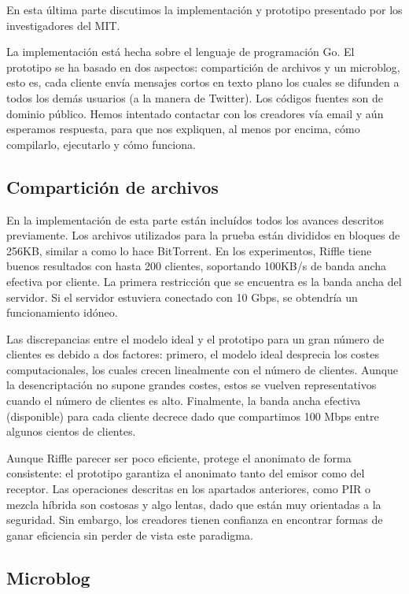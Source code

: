 En esta última parte discutimos la implementación y prototipo presentado por los investigadores del MIT.

La implementación está hecha sobre el lenguaje de programación Go. El prototipo se ha basado en dos aspectos: compartición de archivos y un microblog, esto es, cada cliente envía mensajes cortos en texto plano los cuales se difunden a todos los demás usuarios (a la manera de Twitter). Los códigos fuentes son de dominio público. Hemos intentado contactar con los creadores vía email y aún esperamos respuesta, para que nos expliquen, al menos por encima, cómo compilarlo, ejecutarlo y cómo funciona. 

\subsection{Compartición de archivos}
En la implementación de esta parte están incluídos todos los avances descritos previamente. Los archivos utilizados para la prueba están divididos en bloques de 256KB, similar a como lo hace BitTorrent. En los experimentos, Riffle tiene buenos resultados con hasta 200 clientes, soportando 100KB/s de banda ancha efectiva por cliente. La primera restricción que se encuentra es la banda ancha del servidor. Si el servidor estuviera conectado con 10 Gbps, se obtendría un funcionamiento idóneo.
 
 Las discrepancias entre  el modelo ideal y el prototipo para un gran número de clientes es debido a dos factores: primero, el modelo ideal desprecia los costes computacionales, los cuales crecen linealmente con el número de clientes. Aunque la desencriptación no supone grandes costes, estos se vuelven representativos cuando el número de clientes es alto. Finalmente, la banda ancha efectiva (disponible) para cada cliente decrece dado que compartimos 100 Mbps entre algunos cientos de clientes. 
 
 Aunque Riffle parecer ser poco eficiente, protege el anonimato de forma consistente: el prototipo garantiza el anonimato tanto del emisor como del receptor. Las operaciones descritas en los apartados anteriores, como PIR o mezcla híbrida son costosas y algo lentas, dado que están muy orientadas a la seguridad. Sin embargo, los creadores tienen confianza en encontrar formas de ganar eficiencia sin perder de vista este paradigma. 
 
 \subsection{Microblog}
 
